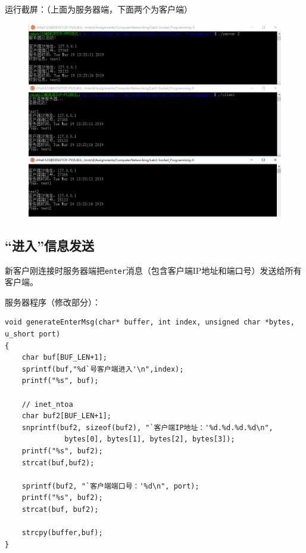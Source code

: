 \documentclass[logo,reportComp]{thesis}
\begin{document}
运行截屏：（上面为服务器端，下面两个为客户端）
\begin{figure}[H]
\centering
\includegraphics[width=\linewidth]{fig/p2.PNG}
\end{figure}

\subsection{``进入''信息发送}
新客户刚连接时服务器端把\verb'enter'消息（包含客户端IP地址和端口号）发送给所有客户端。

服务器程序（修改部分）：
\begin{lstlisting}
void generateEnterMsg(char* buffer, int index, unsigned char *bytes, u_short port)
{
    char buf[BUF_LEN+1];
    sprintf(buf,"%d`号客户端进入'\n",index);
    printf("%s", buf);

    // inet_ntoa
    char buf2[BUF_LEN+1];
    snprintf(buf2, sizeof(buf2), "`客户端IP地址：'%d.%d.%d.%d\n",
              bytes[0], bytes[1], bytes[2], bytes[3]);
    printf("%s", buf2);
    strcat(buf,buf2);

    sprintf(buf2, "`客户端端口号：'%d\n", port);
    printf("%s", buf2);
    strcat(buf, buf2);

    strcpy(buffer,buf);
}
\end{lstlisting}
\end{document}
